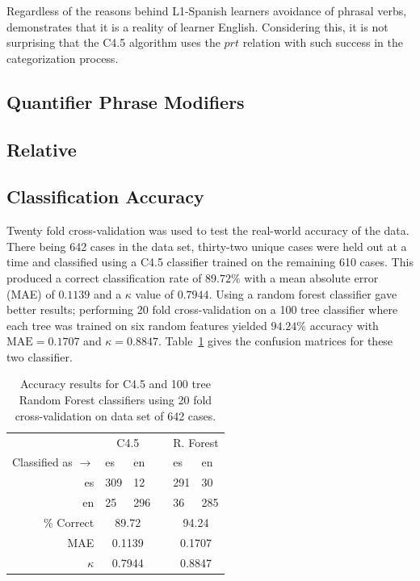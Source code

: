 \documentclass[main.tex]{subfiles}
\begin{document}
Regardless of the reasons behind L1-Spanish learners avoidance of phrasal verbs, \citet{gonzalez:2010} demonstrates that it is a reality of learner English. Considering this, it is not surprising that the C4.5 algorithm uses the $prt$ relation with such success in the categorization process.


\subsection{Quantifier Phrase Modifiers}
\subsection{Relative}

\subsection{Classification Accuracy}

Twenty fold cross-validation was used to test the real-world accuracy of the data. There being 642 cases in the data set, thirty-two unique cases were held out at a time and classified using a C4.5 classifier trained on the remaining 610 cases. This produced a correct classification rate of $89.72\%$ with a mean absolute error (MAE) of $0.1139$ and a $\kappa$ value of $0.7944$. Using a random forest classifier gave better results; performing 20 fold cross-validation on a 100 tree classifier where each tree was trained on six random features yielded $94.24\%$ accuracy with $\text{MAE} = 0.1707$ and $\kappa = 0.8847$. Table~\ref{table:dep-results} gives the confusion matrices for these two classifier.

\begin{table}
\centering
\caption{Accuracy results for C4.5 and 100 tree Random Forest classifiers using 20 fold cross-validation on data set of 642 cases.}
\begin{tabular}{r l l l l l}
\toprule
&\multicolumn{2}{c}{C4.5}& & \multicolumn{2}{c}{R. Forest}\\
\cmidrule{2-3} \cmidrule{5-6}
Classified as $\rightarrow$ & es & en && es & en\\
es &309 & 12 && 291 & 30 \\
en &25 & 296 && 36 & 285 \\
\cmidrule{2-3} \cmidrule{5-6}
\% Correct & \multicolumn{2}{c}{89.72} && \multicolumn{2}{c}{94.24} \\
MAE & \multicolumn{2}{c}{0.1139} && \multicolumn{2}{c}{0.1707} \\
$\kappa$ & \multicolumn{2}{c}{0.7944} && \multicolumn{2}{c}{0.8847} \\
\bottomrule
\end{tabular}

\label{table:dep-results}
\end{table}

\biblio
\end{document}
